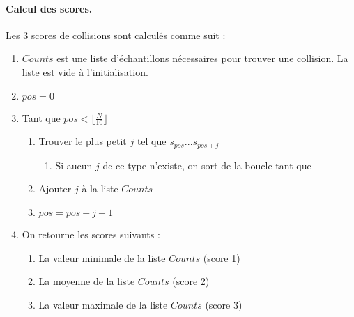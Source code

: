 \paragraph{Calcul des scores.\\}
Les 3 scores de collisions sont calculés comme suit : 
\begin{enumerate}
\item $Counts$ est une liste d'échantillons nécessaires pour trouver une collision. La liste est vide à l'initialisation.
\item $pos=0$
\item Tant que $pos < \lfloor\frac{N}{10}\rfloor$
	\begin{enumerate}
	\item Trouver le plus petit $j$ tel que $s_{pos} ... s_{pos+j}$
		\begin{enumerate}
		\item Si aucun $j$ de ce type n'existe, on sort de la boucle tant que
		\end{enumerate}
	\item Ajouter $j$ à la liste $Counts$
	\item $pos = pos + j + 1$
	\end{enumerate}
\item On retourne les scores suivants : 
	\begin{enumerate}
	\item La valeur minimale de la liste $Counts$ (score 1)
	\item La moyenne de la liste $Counts$ (score 2)
	\item La valeur maximale de la liste $Counts$ (score 3)
	\end{enumerate}
\end{enumerate}

